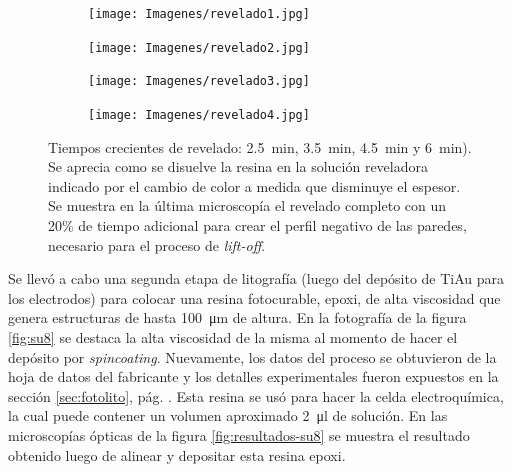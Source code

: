 				\begin{figure}[h!]
			 	   	    \centering
			 	   	    \begin{subfigure}[t]{0.495\textwidth}
			        	\texttt{[image: Imagenes/revelado1.jpg]}
			       		\end{subfigure}
			     		\begin{subfigure}[t]{0.495\textwidth}
			     		\texttt{[image: Imagenes/revelado2.jpg]}
			    		\end{subfigure}
			     		\begin{subfigure}[t]{0.495\textwidth}
						\vspace*{-0.3cm}
			     		\texttt{[image: Imagenes/revelado3.jpg]}
			        	\end{subfigure}
						\begin{subfigure}[t]{0.495\textwidth}
			     		\vspace*{-0.3cm}
			     		\texttt{[image: Imagenes/revelado4.jpg]}
			        	\end{subfigure}
			     		\caption[Revelado en función del tiempo]{Tiempos crecientes de revelado: \SI{2.5}{min}, \SI{3.5}{min}, \SI{4.5}{min} y \SI{6}{min}). Se aprecia como se disuelve la resina en la solución reveladora indicado por el cambio de color a medida que disminuye el espesor. Se muestra en la última microscopía el revelado completo con un 20\% de tiempo adicional para crear el perfil negativo de las paredes, necesario para el proceso de\textit{ lift-off}.}
			     		\label{fig:revelado}
			     	   	\end{figure}

			  \vspace*{2mm}Se llevó a cabo una segunda etapa de litografía (luego del depósito de Ti\textbar Au para los electrodos) para colocar una resina fotocurable, epoxi, de alta viscosidad que genera estructuras de hasta \SI{100}{\um} de altura. En la fotografía de la figura \ref{fig:su8} se destaca la alta viscosidad de la misma al momento de hacer el depósito por \textit{spincoating}. Nuevamente, los datos del proceso se obtuvieron de la hoja de datos del fabricante\cite{Su8,Microchemicals2014} y los detalles experimentales fueron expuestos en  la sección \ref{sec:fotolito}, pág. \pageref{sec:fotolito}. \pagebreak   Esta resina se usó para hacer la celda electroquímica, la cual puede contener un volumen aproximado \SI{2}{\ul} de solución. En las microscopías ópticas de la figura \ref{fig:resultados-su8} se muestra el resultado obtenido luego de alinear y depositar esta resina epoxi.

